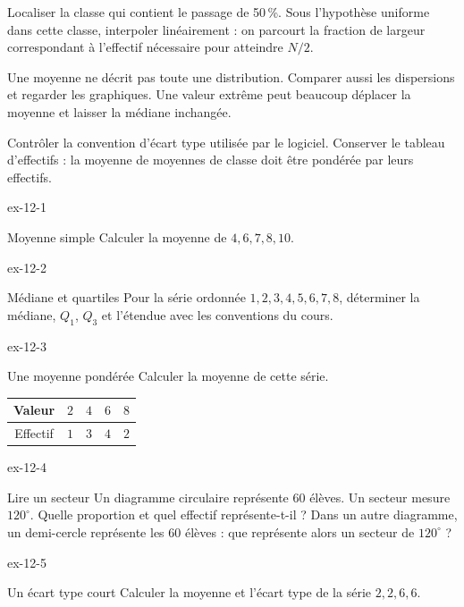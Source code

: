 \begin{savoirfaire}
Localiser la classe qui contient le passage de 50\,\%. Sous l’hypothèse uniforme dans cette classe, interpoler linéairement : on parcourt la fraction de largeur correspondant à l’effectif nécessaire pour atteindre $N/2$.
\end{savoirfaire}
\begin{attention}Une moyenne ne décrit pas toute une distribution. Comparer aussi les dispersions et regarder les graphiques. Une valeur extrême peut beaucoup déplacer la moyenne et laisser la médiane inchangée.\end{attention}
Contrôler la convention d’écart type utilisée par le logiciel. Conserver le tableau d’effectifs : la moyenne de moyennes de classe doit être pondérée par leurs effectifs.
\clearpage{}
\begin{blocLivre}{ex-12-1}
\begin{exercice}[1]{Moyenne simple}
Calculer la moyenne de $4,6,7,8,10$.
\end{exercice}
\end{blocLivre}
\begin{blocLivre}{ex-12-2}
\begin{exercice}[1]{Médiane et quartiles}
Pour la série ordonnée $1,2,3,4,5,6,7,8$, déterminer la médiane, $Q_1$, $Q_3$ et l’étendue avec les conventions du cours.
\end{exercice}
\end{blocLivre}
\begin{blocLivre}{ex-12-3}
\begin{exercice}[1]{Une moyenne pondérée}
Calculer la moyenne de cette série.\begin{center}\renewcommand{\arraystretch}{1.35}\begin{tabular}{c|cccc}\toprule
Valeur & $2$ & $4$ & $6$ & $8$\\\midrule
Effectif & $1$ & $3$ & $4$ & $2$\\
\bottomrule\end{tabular}\end{center}
\label{fig-ex-12-3}
\end{exercice}
\end{blocLivre}
\begin{blocLivre}{ex-12-4}
\begin{exercice}[1]{Lire un secteur}
Un diagramme circulaire représente 60 élèves. Un secteur mesure $120^\circ$. Quelle proportion et quel effectif représente-t-il ? Dans un autre diagramme, un demi-cercle représente les 60 élèves : que représente alors un secteur de $120^\circ$ ?
\label{fig-ex-12-4}
\end{exercice}
\end{blocLivre}
\begin{blocLivre}{ex-12-5}
\begin{exercice}[1]{Un écart type court}
Calculer la moyenne et l’écart type de la série $2,2,6,6$.
\end{exercice}
\end{blocLivre}


